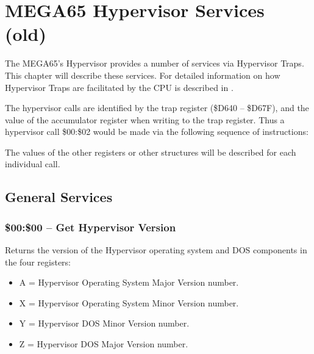 


\chapter{MEGA65 Hypervisor Services (old)}

The MEGA65's Hypervisor provides a number of services via Hypervisor Traps.
This chapter will describe these services.  For detailed information on how
Hypervisor Traps are facilitated by the CPU is described in .

The hypervisor calls are identified by the trap register (\$D640 -- \$D67F), and
the value of the accumulator register when writing to the trap register.  Thus
a hypervisor call \$00:\$02 would be made via the following sequence of instructions:


The values of the other registers or other structures will be described for
each individual call.

\section{General Services}

\subsection{\$00:\$00 -- Get Hypervisor Version}

Returns the version of the Hypervisor operating system and DOS components in the
four registers:

\begin{itemize}
  \item A = Hypervisor Operating System Major Version number. 
  \item X = Hypervisor Operating System Minor Version number. 
  \item Y = Hypervisor DOS Minor Version number. 
  \item Z = Hypervisor DOS Major Version number. 
\end{itemize}

